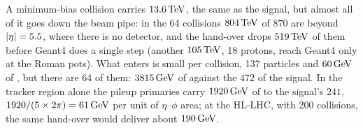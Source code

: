 \begin{plainwords}
A minimum-bias collision carries $13.6\,\mathrm{TeV}$, the same as the signal, but almost all of it goes down the beam
pipe: in the 64 collisions $804\,\mathrm{TeV}$ of $870$ are beyond $|\eta|=5.5$, where there is no detector, and the
hand-over drops $519\,\mathrm{TeV}$ of them before Geant4 does a single step (another $105\,\mathrm{TeV}$, 18 protons, reach Geant4
only at the Roman pots). What enters is small per collision, 137
particles and $60\,\mathrm{GeV}$ of \pt{}, but there are 64 of them: $3815\,\mathrm{GeV}$ of \pt{} against the $472$ of the
signal. In the tracker region alone the pileup primaries carry $1920\,\mathrm{GeV}$ of \pt{} to the signal's $241$,
$1920/(5\times2\pi) = 61\,\mathrm{GeV}$ per unit of $\eta$--$\phi$ area; at the HL-LHC, with 200 collisions, the same
hand-over would deliver about $190\,\mathrm{GeV}$.
\end{plainwords}


